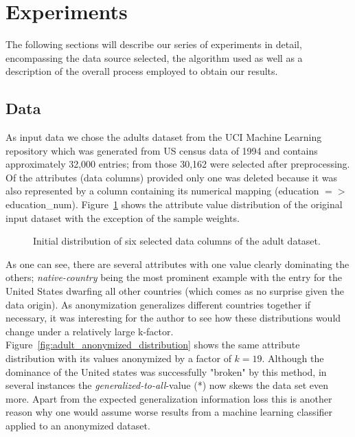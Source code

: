 \documentclass{llncs}
\begin{document}
\section{Experiments}
\label{sect:experiments}

The following sections will describe our series of experiments in detail, encompassing the data source selected, the algorithm used as well as a description of the overall process employed to obtain our results.


\subsection{Data} 
\label{ssect:data}

As input data we chose the adults dataset from the UCI Machine Learning repository which was generated from US census data of 1994 and contains approximately 32,000 entries; from those 30,162 were selected after preprocessing. Of the attributes (data columns) provided only one was deleted because it was also represented by a column containing its numerical mapping (education $=>$ education\_num). Figure~\ref{fig:adult_original_distribution} shows the attribute value distribution of the original input dataset with the exception of the sample weights.


\begin{figure}[!t]
	\begin{center}
    \hspace*{-0.8cm}
		\caption{Initial distribution of six selected data columns of the adult dataset.}
		\label{fig:adult_original_distribution}
	\end{center}
\end{figure}

As one can see, there are several attributes with one value clearly dominating the others; \textit{native-country} being the most prominent example with the entry for the United States dwarfing all other countries (which comes as no surprise given the data origin). As anonymization generalizes different countries together if necessary, it was interesting for the author to see how these distributions would change under a relatively large k-factor. Figure~\ref{fig:adult_anonymized_distribution} shows the same attribute distribution with its values anonymized by a factor of $k=19$. Although the dominance of the United states was successfully "broken" by this method, in several instances the \textit{generalized-to-all}-value (*) now skews the data set even more. Apart from the expected generalization information loss this is another reason why one would assume worse results from a machine learning classifier applied to an anonymized dataset.
\end{document}
